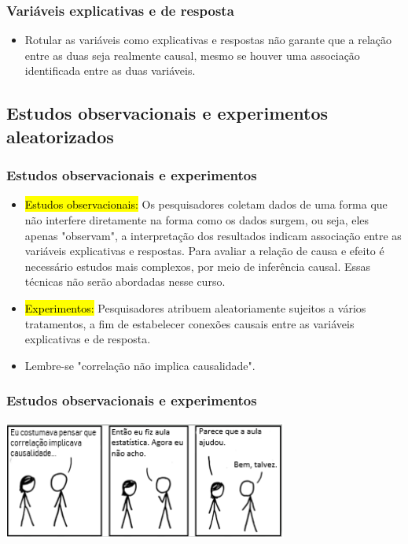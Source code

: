 \begin{frame}
\frametitle{Variáveis explicativas e de resposta}

\begin{itemize}
\justifying

\begin{center}
Variável explicativa $\xrightarrow{pode~afetar}$ variável resposta
\end{center}
\justifying
\item Rotular as variáveis como explicativas e respostas não garante que a relação entre as duas seja realmente causal, mesmo se houver uma associação identificada entre as duas variáveis. 

\end{itemize}

\end{frame}


\subsection{Estudos observacionais e experimentos aleatorizados}


\begin{frame}
\frametitle{Estudos observacionais e experimentos}

\begin{itemize}
\justifying
\item \hl{Estudos observacionais:} Os pesquisadores coletam dados de uma forma que não interfere diretamente na forma como os dados surgem, ou seja, eles apenas "observam", a interpretação dos resultados indicam associação entre as variáveis explicativas e respostas. Para avaliar a relação de causa e efeito é necessário estudos mais complexos, por meio de inferência causal. Essas técnicas não serão abordadas nesse curso.

\pause
\justifying
\item \hl{Experimentos:} Pesquisadores atribuem aleatoriamente sujeitos a vários tratamentos, a fim de estabelecer conexões causais entre as variáveis explicativas e de resposta.

\pause
\justifying
\item Lembre-se "correlação não implica causalidade".
\end{itemize}
\end{frame}

\begin{frame}
\frametitle{Estudos observacionais e experimentos}

\begin{center}
\includegraphics[width=0.7\textwidth]{1-3_data_collection_principles/xkcd_correlation.png} \\
{\tiny {}}
\end{center}

\end{frame}


